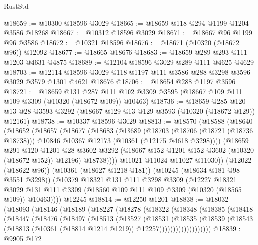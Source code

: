 \begin{lexlean}{RustStd}
\begin{coremodule}
@18659 := @10300 @18596 @3029
@18665 := @18659 @118 @294 @1199 @1204 @3586 @18268
@18667 := @10312 @18596 @3029
@18671 := @18667 @96 @1199 @96 @3586
@18672 := @10321 @18596
@18676 := @18671 (@10320 (@18672 @96)) @12092
@18677 := @18665 @18676
@18683 := @18659 @289 @293 @111 @1203 @4631 @4875
@18689 := @12104 @18596 @3029 @289 @111 @4625 @4629
@18703 := @12114 @18596 @3029 @118 @1197 @111 @3586 @288 @3298 @3596 @3029 @3579 @1301 @4621 @18676
@18706 := @18654 @288 @1197 @3596
@18721 := @18659
    @131
    @287
    @111
    @102
    @3309
    @3595
    (@18667 @109 @111 @109 @3309 (@10320 (@18672 @109)) @10463)
@18736 := @18659
    @285
    @120
    @13
    @28
    @3593
    @3292
    (@18667 @129 @13 @129 @3593 (@10320 (@18672 @129)) @12161)
@18738 := @10337 @18596 @3029
@18813 := @18570
    (@18588
      (@18640
        (@18652
          (@18657
            (@18677
              (@18683
                (@18689
                  (@18703
                    (@18706 (@18721 (@18736 @18738)))
                    @10846
                    @10367
                    @12173
                    (@10361 (@12175 @4618 @3298))))
                (@18659
                  @291
                  @120
                  @1201
                  @28
                  @3602
                  @3292
                  (@18667 @152 @1201 @152 @3602 (@10320 (@18672 @152)) @12196)
                  @18738))))
          @11021
          @11024
          @11027
          @11030))
      (@12022 (@18622 @96))
      (@10361 (@18627 @1218 @181))
      (@10245 (@18634 @181 @98 @3551 @3298))
      (@10379
        @18321
        @131
        @111
        @3298
        @3309
        (@12227
          @18321
          @3029
          @131
          @111
          @3309
          (@18560 @109 @111 @109 @3309 (@10320 (@18565 @109)) @10463))))
    @12245
@18814 := @12250 @1201
@18838 := @18032
    (@18093
      (@18146
        (@18189
          (@18227
            (@18278
              (@18322
                (@18348
                  (@18385
                    (@18418
                      (@18447
                        (@18476
                          (@18497
                            (@18513
                              (@18527
                                (@18531
                                  (@18535
                                    (@18539
                                      (@18543
                                        (@18813
                                          (@10361 (@18814 @1214 @1219))
                                          @12257)))))))))))))))))))
@18839 := @9905 @172

\end{coremodule}
\end{lexlean}
